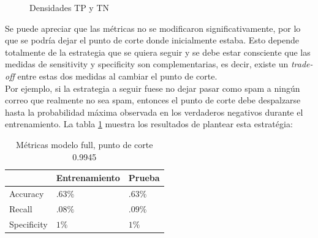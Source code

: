 \documentclass[12pt, letterpaper]{article}
\begin{document}
\begin{figure}[h]
 \centering
 \caption{Densidades TP y TN}
 \label{log4}
\end{figure}

Se puede apreciar que las métricas no se modificaron significativamente, por lo que se podría dejar el punto de corte donde inicialmente estaba. Esto depende totalmente de la estrategia que se quiera seguir y se debe estar consciente que las medidas de sensitivity y specificity son complementarias, es decir, existe un \emph{trade-off} entre estas dos medidas al cambiar el punto de corte.\\

Por ejemplo, si la estrategia a seguir fuese no dejar pasar como spam a ningún correo que realmente no sea spam, entonces el punto de corte debe despalzarse hasta la probabilidad máxima observada en los verdaderos negativos durante el entrenamiento. La tabla \ref{log5} muestra los resultados de plantear esta estratégia:

\begin{table}[ht]
\centering
\begin{tabular}{|l|l|l|}
\hline
&Entrenamiento&Prueba\\
\hline\hline
Accuracy& $.63\%$ & $.63 \%$ \\ \hline
Recall & $.08\%$ & $.09 \%$ \\ \hline
Specificity & $1\%$ & $1 \%$ \\ \hline
\end{tabular}
\caption{Métricas modelo full, punto de corte 0.9945}
\label{log5}
\end{table}
\end{document}
